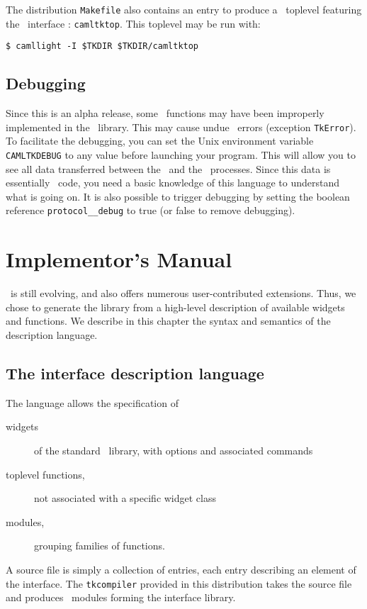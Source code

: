 The distribution \verb|Makefile| also contains an entry to produce a \caml\
toplevel featuring the \tk\ interface : \verb|camltktop|.
This toplevel may be run with: 
\begin{verbatim}
$ camllight -I $TKDIR $TKDIR/camltktop
\end{verbatim} 

\section{Debugging}
Since this is an alpha release, some \tk\ functions may have been improperly
implemented in the \caml\ library. This may cause undue \tk\ errors
(exception \verb|TkError|). To facilitate the debugging, you can set the
Unix environment variable \verb|CAMLTKDEBUG| to any value before launching
your program. This will allow you to see all
data transferred between the \caml\ and the \tk\ processes. Since this data is
essentially \tcl\tk\ code, you need a basic knowledge of this language to
understand what is going on.
It is also possible to trigger debugging by setting the boolean reference
\verb|protocol__debug| to true (or false to remove debugging).


\chapter{Implementor's Manual}
\label{chap:impl}
\tk\ is still evolving, and also offers numerous user-contributed
extensions. Thus, we chose to generate the library from a high-level
description of available widgets and functions. 
We describe in this chapter
the syntax and semantics of the description language.

\section{The interface description language}
The language allows the specification of
\begin{description}
\item[widgets] of the standard \tk\ library, with options and associated commands
\item[toplevel functions,] not associated with a specific widget class
\item[modules,] grouping families of functions.
\end{description} 

A source file is simply a collection of entries, each entry describing an
element of the interface. The {\tt tkcompiler} provided in this distribution
takes the source file and produces \caml\ modules forming the interface
library.

